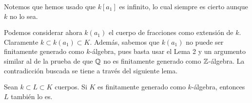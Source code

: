 \documentclass[twoside]{article}
\begin{document}
\begin{ejercicio}{2}
\begin{solucion}
\begin{dem}
Notemos que hemos usado que $k[a_1]$ es infinito, lo cual siempre es cierto aunque $k$ no lo sea.
\end{dem}
Podemos considerar ahora $k(a_1)$ el cuerpo de fracciones como extensión de $k$. Claramente $k\subset k(a_1)\subset K$. Además, sabemos que $k(a_1)$ no puede ser finitamente generado como $k$-álgebra, pues basta usar el Lema 2 y un argumento similar al de la prueba de que $\mathbb{Q}$ no es finitamente generado como $\mathbb{Z}$-álgebra. La contradicción buscada se tiene a través del siguiente lema.
\begin{lema} Sean $k \subset L \subset K$ cuerpos. Si $K$ es finitamente generado como $k$-álgebra, entonces $L$ también lo es.
\end{lema}


\end{solucion}
\end{ejercicio}
\end{document}

